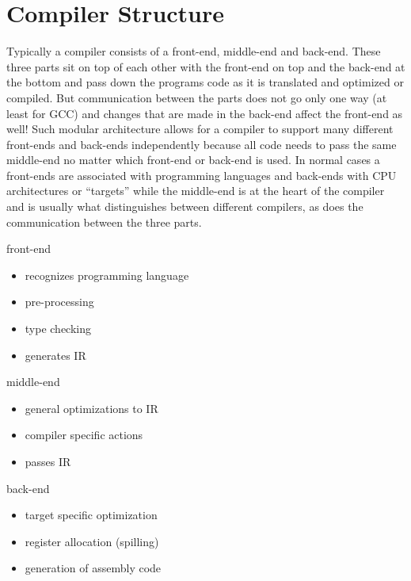 \chapter{Compiler Structure}
\label{chapter:compiler structure}
Typically a compiler consists of a front-end, middle-end and back-end. These three parts sit on top of each other with the front-end on top and the back-end at the bottom and pass down the programs code as it is translated and optimized or compiled. But communication between the parts does not go only one way (at least for GCC)
and changes that are made in the back-end affect the front-end as well!
Such modular architecture  allows for a compiler to support many different front-ends and back-ends independently because all code needs to pass the same middle-end no matter which front-end or back-end is used. In normal cases a front-ends are associated with programming languages and back-ends with CPU architectures or ``targets'' while the middle-end is at the heart of the compiler and is usually what distinguishes between different compilers, as does the communication between the three parts.
\smallskip
 \begin{myexampleblock}{front-end}
	\begin{itemize}
		\item recognizes programming language
		\item pre-processing
		\item type checking
		\item generates IR
	\end{itemize}
\end{myexampleblock}
\begin{myexampleblock}{middle-end}
	\begin{itemize}
		\item general optimizations to IR
		\item compiler specific actions
		\item passes IR
	\end{itemize}
\end{myexampleblock}
\begin{myexampleblock}{back-end}
	\begin{itemize}
		\item target specific optimization
		\item register allocation (spilling)
		\item generation of assembly code
	\end{itemize}
\end{myexampleblock}
